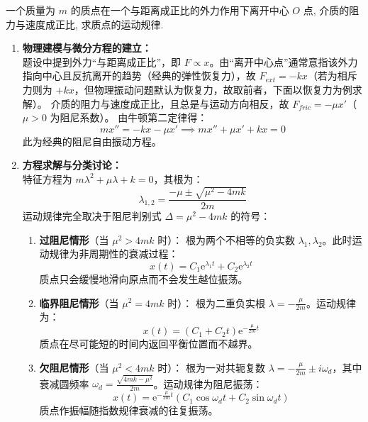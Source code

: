 \documentclass[lang=cn,11pt]{elegantbook}
\begin{document}
\begin{exercise}[阻尼自由振动物理建模]
一个质量为 $m$ 的质点在一个与距离成正比的外力作用下离开中心 $O$ 点, 介质的阻力与速度成正比, 求质点的运动规律.
\end{exercise}
\begin{solution}
\begin{enumerate}
    \item \textbf{物理建模与微分方程的建立：}\\
    题设中提到外力“与距离成正比”，即 $F \propto x$。由“离开中心点”通常意指该外力指向中心且反抗离开的趋势（经典的弹性恢复力），故 $F_{ext} = -k x$（若为相斥力则为 $+kx$，但物理振动问题默认为恢复力，故取前者，下面以恢复力为例求解）。
    介质的阻力与速度成正比，且总是与运动方向相反，故 $F_{fric} = -\mu x'$（$\mu>0$ 为阻尼系数）。
    由牛顿第二定律得：
    \[
    m x'' = -k x - \mu x' \implies m x'' + \mu x' + kx = 0
    \]
    此为经典的阻尼自由振动方程。

    \item \textbf{方程求解与分类讨论：}\\
    特征方程为 $m\lambda^2 + \mu\lambda + k = 0$，其根为：
    \[
    \lambda_{1,2} = \frac{-\mu \pm \sqrt{\mu^2 - 4mk}}{2m}
    \]
    运动规律完全取决于阻尼判别式 $\Delta = \mu^2 - 4mk$ 的符号：
    \begin{enumerate}
        \item[(1)] \textbf{过阻尼情形}（当 $\mu^2 > 4mk$ 时）：
        根为两个不相等的负实数 $\lambda_1, \lambda_2$。此时运动规律为非周期性的衰减过程：
        \[
        \boxed{x(t) = C_1\mathrm{e}^{\lambda_1 t} + C_2\mathrm{e}^{\lambda_2 t}}
        \]
        质点只会缓慢地滑向原点而不会发生越位振荡。

        \item[(2)] \textbf{临界阻尼情形}（当 $\mu^2 = 4mk$ 时）：
        根为二重负实根 $\lambda = -\frac{\mu}{2m}$。运动规律为：
        \[
        \boxed{x(t) = (C_1 + C_2 t)\mathrm{e}^{-\frac{\mu}{2m}t}}
        \]
        质点在尽可能短的时间内返回平衡位置而不越界。

        \item[(3)] \textbf{欠阻尼情形}（当 $\mu^2 < 4mk$ 时）：
        根为一对共轭复数 $\lambda = -\frac{\mu}{2m} \pm i\omega_d$，其中衰减圆频率 $\omega_d = \frac{\sqrt{4mk - \mu^2}}{2m}$。运动规律为阻尼振荡：
        \[
        \boxed{x(t) = \mathrm{e}^{-\frac{\mu}{2m}t}(C_1\cos\omega_d t + C_2\sin\omega_d t)}
        \]
        质点作振幅随指数规律衰减的往复振荡。
    \end{enumerate}
\end{enumerate}
\end{solution}
\end{document}
